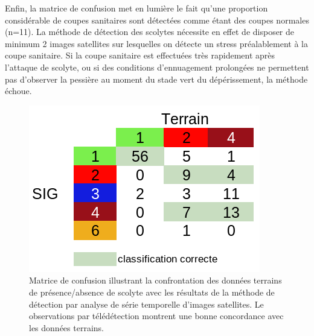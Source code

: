 \documentclass[a4paper, 12pt]{article} %
\begin{document}
Enfin, la matrice de confusion met en lumière le fait qu'une proportion considérable de coupes sanitaires sont détectées comme étant des coupes normales (n=11). La méthode de détection des scolytes nécessite en effet de disposer de minimum 2 images satellites sur lesquelles on détecte un stress préalablement à la coupe sanitaire. Si la coupe sanitaire est effectuées très rapidement après l'attaque de scolyte, ou si des conditions d'ennuagement prolongées ne permettent pas d'observer la pessière au moment du stade vert du dépérissement, la méthode échoue.

\begin{figure}
	\centering
	\includegraphics[width=\linewidth]{confusionMat.png}
	\caption{Matrice de confusion illustrant la confrontation des données terrains de présence/absence de scolyte avec les résultats de la méthode de détection par analyse de série temporelle d'images satellites. Le observations par télédétection montrent une bonne concordance avec les données terrains.}
	\label{fig:tabConMat}
\end{figure}



\end{document}
